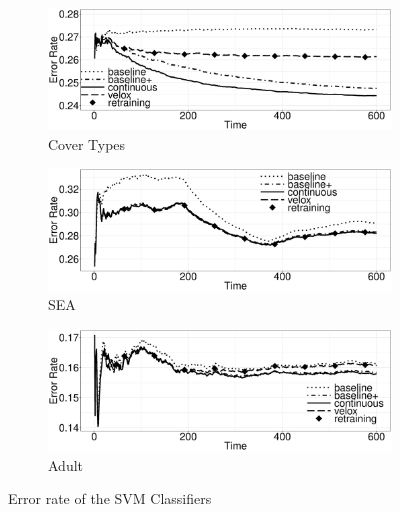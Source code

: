\documentclass{vldb}
\begin{document}
\begin{figure}[h]
	\centering
\begin{subfigure}[b]{\columnwidth}
	\includegraphics[width=\columnwidth]{../images/experiment-results/cover-types-quality.eps}
	\caption{Cover Types}
	\label{fig:cover-types-quality}
\end{subfigure}
\begin{subfigure}[b]{\columnwidth}
  	\includegraphics[width=\columnwidth]{../images/experiment-results/sea-quality.eps}
	\caption{SEA}
	\label{fig:sea-quality}
\end{subfigure}
\begin{subfigure}[b]{\columnwidth}
  	\includegraphics[width=\columnwidth]{../images/experiment-results/adult-quality.eps}
	\caption{Adult}
	\label{fig:adult-quality}
\end{subfigure}
\vspace{2mm}
\caption{Error rate of the SVM Classifiers}
\label{fig:local-classification-results}
\end{figure}
\end{document}
